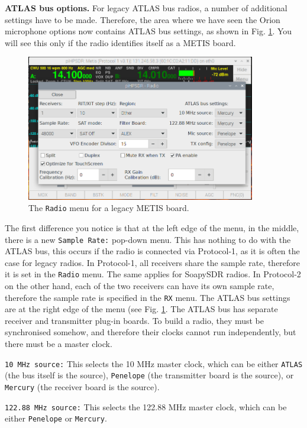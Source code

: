 \documentclass[12pt]{book}
\def\rett#1{\texttt{\color{red}#1}}
\def\bltt#1{\texttt{\color{blue}#1}}
\begin{document}
 \textbf{ATLAS bus options.} For legacy ATLAS bus radios, a number of additional settings have to be
 made. Therefore, the area where we have seen the Orion microphone options now contains ATLAS bus
 settings, as shown in Fig. \ref{fig:RadioMenuMetis}. You will see this only if the radio identifies
 itself as a METIS board.

\begin{figure}[ht]
\center
\includegraphics[width=10cm]{RadioMenuMetis.png}
\caption{The \bltt{Radio} menu for a legacy METIS board.}
\label{fig:RadioMenuMetis}
\end{figure}

The first difference you notice is that at the left edge of the menu, in the middle,
there is a new \rett{Sample Rate:} pop-down menu. This has nothing to do with the
ATLAS bus, this occurs if the radio is connected via Protocol-1, as it is often the case for
legacy radios. In Protocol-1, all receivers share the sample rate, therefore it is set in the
\bltt{Radio} menu. The same applies for SoapySDR radios. In Protocol-2 on the other hand, each
of the two receivers can have its own sample rate, therefore the sample rate is specified
in the \bltt{RX} menu. The ATLAS bus settings are at the right edge of the menu (see Fig.
\ref{fig:RadioMenuMetis}. The ATLAS bus has separate receiver and transmitter plug-in boards.
To build a radio, they must be synchronised somehow, and therefore their clocks cannot run
independently, but there must be a master clock.

\rett{10 MHz source:} This selects the 10 MHz master clock, which can be either \texttt{ATLAS}
(the bus itself is the source), \texttt{Penelope} (the transmitter board is the source),
or \texttt{Mercury} (the receiver board is the source).

\rett{122.88 MHz source:} This selects the 122.88 MHz master clock, which can be either
\texttt{Penelope} or \texttt{Mercury}.
\end{document}
